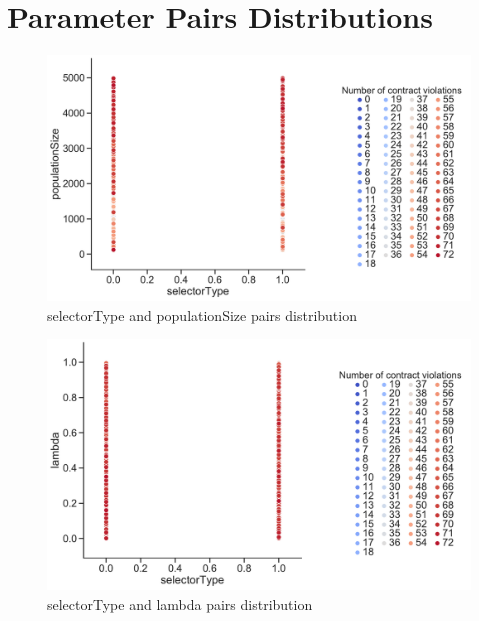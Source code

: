 \chapter{Parameter Pairs Distributions}\label{appendix:Distributions1}
\begin{figure}
	\centering
	\includegraphics[width=\textwidth]{images/PairsDistr/selectorType_populationSize.pdf}
	\caption[selectorType and populationSize pairs distribution]{selectorType and populationSize pairs distribution}
	\label{fig:selectorType_populationSize_pair}
\end{figure}
\begin{figure}
	\centering
	\includegraphics[width=\textwidth]{images/PairsDistr/selectorType_lambda.pdf}
	\caption[selectorType and lambda pairs distribution]{selectorType and lambda pairs distribution}
	\label{fig:selectorType_lambda_pair}
\end{figure}
